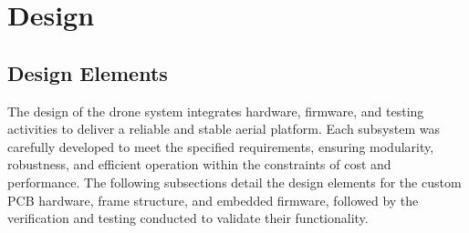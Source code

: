 \section{Design}


\pagebreak

\subsection{Design Elements}
\label{sec:design-elements}

The design of the drone system integrates hardware, firmware, and testing activities to deliver a reliable and stable aerial platform. Each subsystem was carefully developed to meet the specified requirements, ensuring modularity, robustness, and efficient operation within the constraints of cost and performance. The following subsections detail the design elements for the custom PCB hardware, frame structure, and embedded firmware, followed by the verification and testing conducted to validate their functionality.


\pagebreak


\pagebreak


\pagebreak




